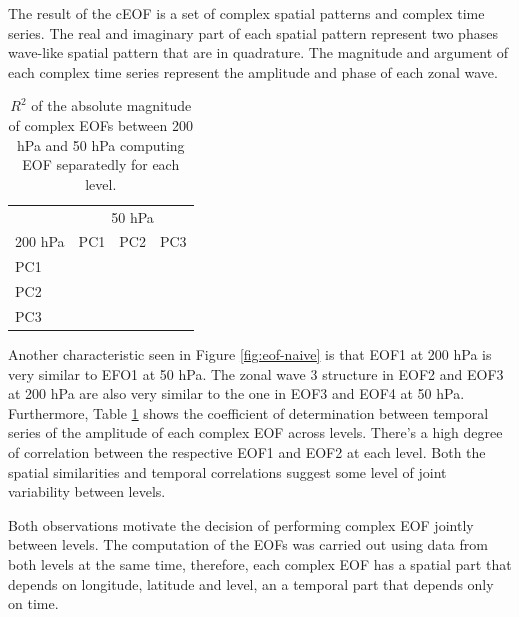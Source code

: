 \documentclass[smallextended]{svjour3}       %
\begin{document}
The result of the cEOF is a set of complex spatial patterns and complex time series. The real and imaginary part of each spatial pattern represent two phases wave-like spatial pattern that are in quadrature. The magnitude and argument of each complex time series represent the amplitude and phase of each zonal wave.

\begin{table}

\caption{\label{tab:corr-ceof-splitted}$R^2$ of the absolute magnitude of complex EOFs between 200 hPa and 50 hPa computing EOF separatedly for each level.}
\centering
\begin{tabular}[t]{l>{}r>{}r>{}r}
\toprule
\multicolumn{1}{c}{} & \multicolumn{3}{c}{50 hPa} \\
\cmidrule(l{3pt}r{3pt}){2-4}
200 hPa & PC1 & PC2 & PC3\\
\midrule
PC1 & \cellcolor[HTML]{E1C0BB}{\textcolor{black}{0.28}} & \cellcolor[HTML]{FDFAFA}{\textcolor{black}{0.02}} & \cellcolor[HTML]{FDFAFA}{\textcolor{black}{0.02}}\\
PC2 & \cellcolor[HTML]{FFFFFF}{\textcolor{black}{0.00}} & \cellcolor[HTML]{BB7A73}{\textcolor{white}{0.60}} & \cellcolor[HTML]{FDFAFA}{\textcolor{black}{0.02}}\\
PC3 & \cellcolor[HTML]{FFFFFF}{\textcolor{black}{0.00}} & \cellcolor[HTML]{FFFFFF}{\textcolor{black}{0.00}} & \cellcolor[HTML]{FDFCFC}{\textcolor{black}{0.01}}\\
\bottomrule
\end{tabular}
\end{table}

Another characteristic seen in Figure \ref{fig:eof-naive} is that EOF1 at 200 hPa is very similar to EFO1 at 50 hPa. The zonal wave 3 structure in EOF2 and EOF3 at 200 hPa are also very similar to the one in EOF3 and EOF4 at 50 hPa. Furthermore, Table \ref{tab:corr-ceof-splitted} shows the coefficient of determination between temporal series of the amplitude of each complex EOF across levels. There's a high degree of correlation between the respective EOF1 and EOF2 at each level. Both the spatial similarities and temporal correlations suggest some level of joint variability between levels.

Both observations motivate the decision of performing complex EOF jointly between levels. The computation of the EOFs was carried out using data from both levels at the same time, therefore, each complex EOF has a spatial part that depends on longitude, latitude and level, an a temporal part that depends only on time.
\end{document}
